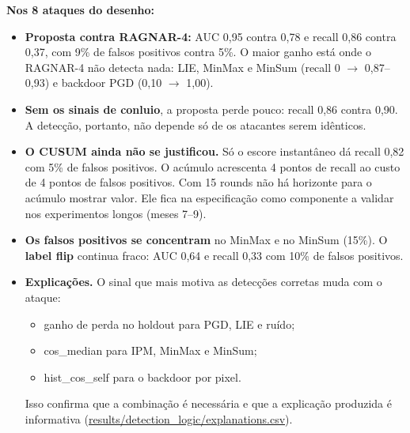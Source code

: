 \documentclass[11pt,a4paper]{article}
\begin{document}
\noindent\textbf{Nos 8 ataques do desenho:}
\begin{itemize}
  \item \textbf{Proposta contra RAGNAR-4:} AUC 0,95 contra 0,78 e recall 0,86 contra 0,37, com 9\% de
        falsos positivos contra 5\%. O maior ganho está onde o RAGNAR-4 não detecta nada: LIE, MinMax e
        MinSum (recall 0 $\to$ 0,87--0,93) e backdoor PGD (0,10 $\to$ 1,00).
  \item \textbf{Sem os sinais de conluio}, a proposta perde pouco: recall 0,86 contra 0,90. A detecção,
        portanto, não depende só de os atacantes serem idênticos.
  \item \textbf{O CUSUM ainda não se justificou.} Só o escore instantâneo dá recall 0,82 com 5\% de falsos
        positivos. O acúmulo acrescenta 4 pontos de recall ao custo de 4 pontos de falsos positivos. Com 15
        rounds não há horizonte para o acúmulo mostrar valor. Ele fica na especificação como componente a
        validar nos experimentos longos (meses 7--9).
  \item \textbf{Os falsos positivos se concentram} no MinMax e no MinSum (15\%). O \textbf{label flip}
        continua fraco: AUC 0,64 e recall 0,33 com 10\% de falsos positivos.
  \item \textbf{Explicações.} O sinal que mais motiva as detecções corretas muda com o ataque:
        \begin{itemize}
          \item ganho de perda no holdout para PGD, LIE e ruído;
          \item cos\_median para IPM, MinMax e MinSum;
          \item hist\_cos\_self para o backdoor por pixel.
        \end{itemize}
        Isso confirma que a combinação é necessária e que a explicação produzida é informativa
        (\url{results/detection_logic/explanations.csv}).
\end{itemize}
\end{document}
